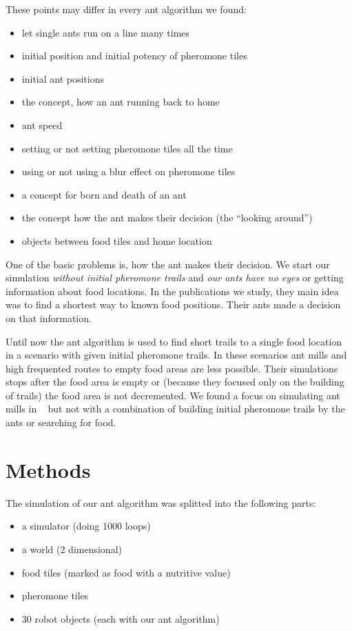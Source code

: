 These points may differ in every ant algorithm we found:

\begin{itemize}
\tightlist
\item
  let single ants run on a line many times
\item
  initial position and initial potency of pheromone tiles
\item
  initial ant positions
\item
  the concept, how an ant running back to home
\item
  ant speed
\item
  setting or not setting pheromone tiles all the time
\item
  using or not using a blur effect on pheromone tiles
\item
  a concept for born and death of an ant
\item
  the concept how the ant makes their decision (the ``looking around'')
\item
  objects between food tiles and home location
\end{itemize}

One of the basic problems is, how the ant makes their decision. We start
our simulation \emph{without initial pheromone trails} and \emph{our
ants have no eyes} or getting information about food locations. In the
publications we study, they main idea was to find a shortest way to
known food positions. Their ants made a decision on that information.

Until now the ant algorithm is used to find short trails to a single
food location in a scenario with given initial pheromone trails. In
these scenarios ant mills and high frequented routes to empty food areas
are less possible. Their simulations stops after the food area is empty
or (because they focused only on the building of trails) the food area
is not decremented. We found a focus on simulating ant mills in
~\cite{Couzin139} but not with a combination of building initial
pheromone trails by the ants or searching for food.

\section{Methods}\label{methods}

The simulation of our ant algorithm was splitted into the following
parts:

\begin{itemize}
\tightlist
\item
  a simulator (doing 1000 loops)
\item
  a world (2 dimensional)
\item
  food tiles (marked as food with a nutritive value)
\item
  pheromone tiles
\item
  30 robot objects (each with our ant algorithm)
\end{itemize}

